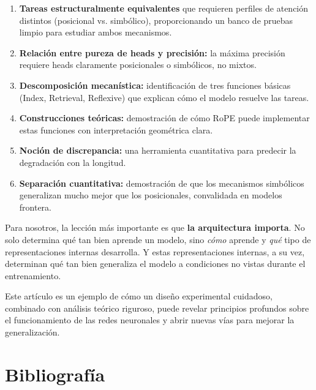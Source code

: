 \documentclass[12pt,a4paper,oneside]{report}
\begin{document}
\begin{enumerate}
    \item \textbf{Tareas estructuralmente equivalentes} que requieren perfiles de atención distintos (posicional vs. simbólico), proporcionando un banco de pruebas limpio para estudiar ambos mecanismos.
    \item \textbf{Relación entre pureza de heads y precisión:} la máxima precisión requiere heads claramente posicionales o simbólicos, no mixtos.
    \item \textbf{Descomposición mecanística:} identificación de tres funciones básicas (Index, Retrieval, Reflexive) que explican cómo el modelo resuelve las tareas.
    \item \textbf{Construcciones teóricas:} demostración de cómo RoPE puede implementar estas funciones con interpretación geométrica clara.
    \item \textbf{Noción de discrepancia:} una herramienta cuantitativa para predecir la degradación con la longitud.
    \item \textbf{Separación cuantitativa:} demostración de que los mecanismos simbólicos generalizan mucho mejor que los posicionales, convalidada en modelos frontera.
\end{enumerate}

Para nosotros, la lección más importante es que \textbf{la arquitectura importa}. No solo determina qué tan bien aprende un modelo, sino \emph{cómo} aprende y \emph{qué} tipo de representaciones internas desarrolla. Y estas representaciones internas, a su vez, determinan qué tan bien generaliza el modelo a condiciones no vistas durante el entrenamiento.

Este artículo es un ejemplo de cómo un diseño experimental cuidadoso, combinado con análisis teórico riguroso, puede revelar principios profundos sobre el funcionamiento de las redes neuronales y abrir nuevas vías para mejorar la generalización.

\chapter*{Bibliografía}
\end{document}
